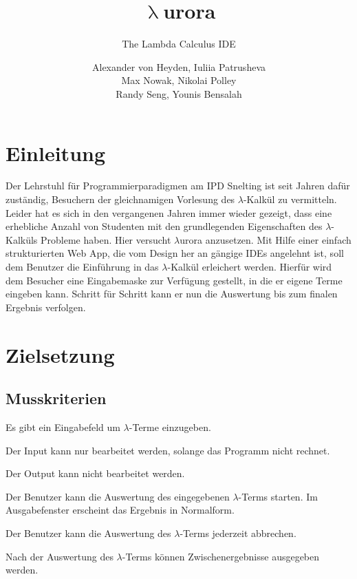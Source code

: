 \documentclass[parskip=full,11pt,twoside]{scrartcl}
\title{\textbf{$\uplambda$}urora}
\subtitle{The Lambda Calculus IDE}
\author{Alexander von Heyden, Iuliia Patrusheva\\
 Max Nowak, Nikolai Polley\\
 Randy Seng, Younis Bensalah}
\begin{document}
\maketitle
\newpage
\tableofcontents

\newpage
\section{Einleitung}
Der Lehrstuhl für Programmierparadigmen am IPD Snelting ist seit Jahren dafür zuständig, Besuchern der gleichnamigen Vorlesung des $\lambda$-Kalkül zu vermitteln. Leider hat es sich in den vergangenen Jahren immer wieder gezeigt, dass eine erhebliche Anzahl von Studenten mit den grundlegenden Eigenschaften des $\lambda$-Kalküls Probleme haben. Hier versucht $\lambda$urora anzusetzen. Mit Hilfe einer einfach strukturierten Web App, die vom Design her an gängige IDEs angelehnt ist, soll dem Benutzer die Einführung in das $\lambda$-Kalkül erleichert werden. Hierfür wird dem Besucher eine Eingabemaske zur Verfügung gestellt, in die er eigene Terme eingeben kann. Schritt für Schritt kann er nun die Auswertung bis zum finalen Ergebnis verfolgen.


\newpage
\section{Zielsetzung}

\subsection{Musskriterien}

Es gibt ein Eingabefeld um $\lambda$-Terme einzugeben.

Der Input kann nur bearbeitet werden, solange das Programm nicht rechnet.

Der Output kann nicht bearbeitet werden.

Der Benutzer kann die Auswertung des eingegebenen $\lambda$-Terms starten. Im Ausgabefenster erscheint das Ergebnis in Normalform.

Der Benutzer kann die Auswertung des $\lambda$-Terms jederzeit abbrechen.

Nach der Auswertung des $\lambda$-Terms können Zwischenergebnisse ausgegeben werden.
\end{document}
